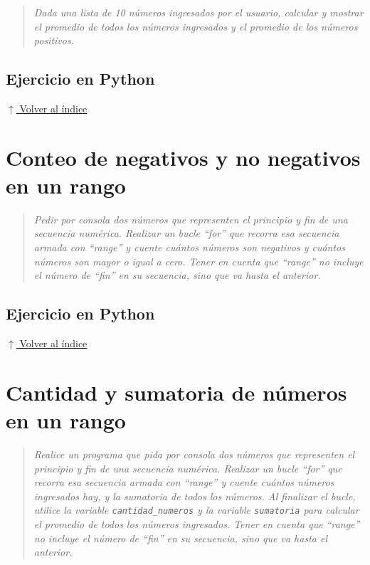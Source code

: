 \documentclass[12pt]{article}
\newcommand{\codigopython}[2]{%
}
\newcommand{\volverindice}{%
    \vspace{1em}%
    \begin{flushright}%
        \hyperlink{indice}{\small $\uparrow$ Volver al índice}%
    \end{flushright}%
}
\newcommand{\enunciado}[1]{%
    \begin{quote}
        \itshape #1
    \end{quote}
}
\begin{document}
\enunciado{Dada una lista de 10 números ingresados por el usuario, calcular y mostrar el promedio de todos los números ingresados y el promedio de los números positivos.}

\subsection*{Ejercicio en Python}

\codigopython{27}{Promedio general y promedio de los números positivos}

\volverindice
\newpage


\section{Conteo de negativos y no negativos en un rango}

\enunciado{Pedir por consola dos números que representen el principio y fin de una secuencia numérica. Realizar un bucle \enquote{for} que recorra esa secuencia armada con \enquote{range} y cuente cuántos números son negativos y cuántos números son mayor o igual a cero. Tener en cuenta que \enquote{range} no incluye el número de \enquote{fin} en su secuencia, sino que va hasta el anterior.}

\subsection*{Ejercicio en Python}

\codigopython{28}{Conteo de negativos y no negativos en un rango}

\volverindice
\newpage


\section{Cantidad y sumatoria de números en un rango}

\enunciado{Realice un programa que pida por consola dos números que representen el principio y fin de una secuencia numérica. Realizar un bucle \enquote{for} que recorra esa secuencia armada con \enquote{range} y cuente cuántos números ingresados hay, y la sumatoria de todos los números. Al finalizar el bucle, utilice la variable \texttt{cantidad\_numeros} y la variable \texttt{sumatoria} para calcular el promedio de todos los números ingresados. Tener en cuenta que \enquote{range} no incluye el número de \enquote{fin} en su secuencia, sino que va hasta el anterior.}
\end{document}
